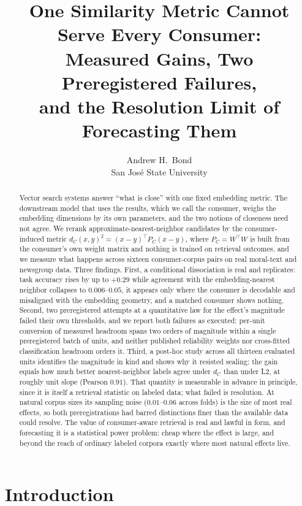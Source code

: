 \documentclass{article}
\title{One Similarity Metric Cannot Serve Every Consumer:\\ Measured Gains, Two Preregistered Failures,\\ and the Resolution Limit of Forecasting Them}
\author{\name Andrew H.\ Bond \email [TODO: email]\\
\addr San Jos\'e State University}
\begin{document}
\maketitle

\begin{abstract}
Vector search systems answer ``what is close'' with one fixed embedding
metric. The downstream model that uses the results, which we call the
consumer, weighs the embedding dimensions by its own parameters, and the two
notions of closeness need not agree. We rerank approximate-nearest-neighbor
candidates by the consumer-induced metric
$d_C(x,y)^2=(x-y)^\top P_C(x-y)$, where $P_C=W^\top W$ is built from the
consumer's own weight matrix and nothing is trained on retrieval outcomes,
and we measure what happens across sixteen consumer-corpus pairs on real
moral-text and newsgroup data. Three findings. First, a conditional
dissociation is real and replicates: task accuracy rises by up to $+0.29$
while agreement with the embedding-nearest neighbor collapses to $0.006$--$0.05$,
it appears only where the consumer is decodable and misaligned with the
embedding geometry, and a matched consumer shows nothing. Second, two
preregistered attempts at a quantitative law for the effect's magnitude
failed their own thresholds, and we report both failures as executed: per-unit
conversion of measured headroom spans two orders of magnitude within a single
preregistered batch of units, and neither published reliability weights nor cross-fitted
classification headroom orders it. Third, a post-hoc study across all thirteen
evaluated units identifies the magnitude in kind and shows why it resisted
sealing: the gain equals how much better nearest-neighbor labels agree under
$d_C$ than under L2, at roughly unit slope (Pearson $0.91$). That quantity
is measurable in advance in principle, since it is itself a retrieval
statistic on labeled data; what failed is resolution. At natural corpus
sizes its sampling noise ($0.01$--$0.06$ across folds) is the size of most
real effects, so both preregistrations had barred distinctions finer than
the available data could resolve. The value of consumer-aware retrieval is
real and lawful in form, and forecasting it is a statistical power problem:
cheap where the effect is large, and beyond the reach of ordinary labeled
corpora exactly where most natural effects live.
\end{abstract}

\section{Introduction}
\end{document}

